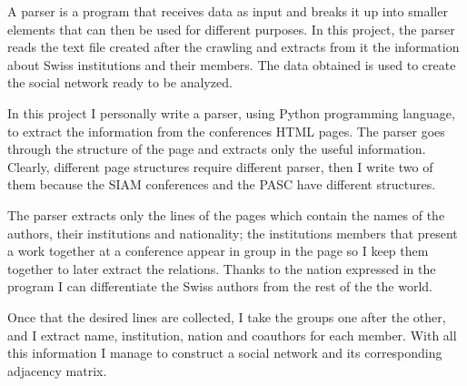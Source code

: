 \documentclass[]{usiinfbachelorproject}
\begin{document}
A parser is a program that receives data as input and breaks it up into smaller elements that can then be used for different purposes. In this project, the parser reads the text file created after the crawling and extracts from it the information about Swiss institutions and their members. The data obtained is used to create the social network ready to be analyzed.

In this project I personally write a parser, using Python programming language, to extract the information from the conferences HTML pages. The parser goes through the structure of the page and extracts only the useful information. Clearly, different page structures require different parser, then I write two of them because the SIAM conferences and the PASC have different structures.

The parser extracts only the lines of the pages which contain the names of the authors, their institutions and nationality; the institutions members that present a work together at a conference appear in group in the page so I keep them together to later extract the relations. Thanks to the nation expressed in the program I can differentiate the Swiss authors from the rest of the the world. 

Once that the desired lines are collected, I take the groups one after the other, and I extract name, institution, nation and coauthors for each member. With all this information I manage to construct a social network and its corresponding adjacency matrix.
\end{document}
